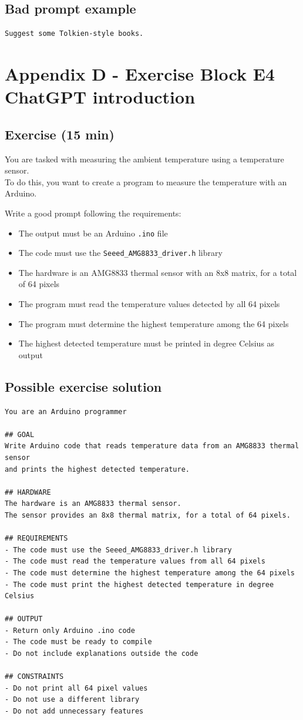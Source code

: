 \documentclass{article}
\begin{document}
\subsection*{Bad prompt example}
\begin{verbatim}
Suggest some Tolkien-style books.
\end{verbatim}

\newpage
\section*{Appendix D - Exercise Block E4 ChatGPT introduction}
\subsection*{Exercise (15 min)}
You are tasked with measuring the ambient temperature using a temperature sensor.\\
To do this, you want to create a program to measure the temperature with an Arduino.

Write a good prompt following the requirements:
\begin{itemize}
    \item The output must be an Arduino \texttt{.ino} file
    \item The code must use the \texttt{Seeed\_AMG8833\_driver.h} library
    \item The hardware is an AMG8833 thermal sensor with an 8x8 matrix, for a total of 64 pixels
    \item The program must read the temperature values detected by all 64 pixels
    \item The program must determine the highest temperature among the 64 pixels
    \item The highest detected temperature must be printed in degree Celsius as output
\end{itemize}

\newpage
\subsection*{Possible exercise solution}
\begin{verbatim}
You are an Arduino programmer

## GOAL
Write Arduino code that reads temperature data from an AMG8833 thermal sensor
and prints the highest detected temperature.

## HARDWARE
The hardware is an AMG8833 thermal sensor.
The sensor provides an 8x8 thermal matrix, for a total of 64 pixels.

## REQUIREMENTS
- The code must use the Seeed_AMG8833_driver.h library
- The code must read the temperature values from all 64 pixels
- The code must determine the highest temperature among the 64 pixels
- The code must print the highest detected temperature in degree Celsius

## OUTPUT
- Return only Arduino .ino code
- The code must be ready to compile
- Do not include explanations outside the code

## CONSTRAINTS
- Do not print all 64 pixel values
- Do not use a different library
- Do not add unnecessary features
\end{verbatim}
\end{document}
